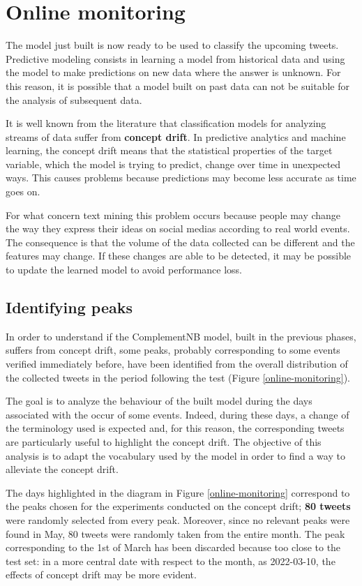 \section{Online monitoring}

The model just built is now ready to be used to classify the upcoming tweets. Predictive modeling consists in learning a model from historical data and using the model to make predictions on new data where the answer is unknown. For this reason, it is possible that a model built on past data can not be suitable for the analysis of subsequent data.

It is well known from the literature that classification models for analyzing streams of data suffer from \textbf{concept drift}. In predictive analytics and machine learning, the concept drift means that the statistical properties of the target variable, which the model is trying to predict, change over time in unexpected ways. This causes problems because predictions may become less accurate as time goes on.

For what concern text mining this problem occurs because people may change the way they express their ideas on social medias according to real world events. The consequence is that the volume of the data collected can be different and the features may change. 
If these changes are able to be detected, it may be possible to update the learned model to avoid performance loss. 

\subsection{Identifying peaks}

In order to understand if the ComplementNB model, built in the previous phases, suffers from concept drift, some {peaks},  probably corresponding to some events verified immediately before, have been identified from the overall distribution of the collected tweets  in the period following the test (Figure \ref{online-monitoring}). 

The goal is to analyze the behaviour of the built model during the days associated with the occur of some  events. Indeed, during these days, a change of the terminology used is expected and, for this reason, the corresponding tweets are particularly useful to highlight the concept drift. 
The objective of this analysis is to adapt the vocabulary used by the model in order to find a way to alleviate the concept drift.

The days highlighted in the diagram in Figure \ref{online-monitoring} correspond to the peaks chosen for the experiments conducted on the concept drift; \textbf{80 tweets} were randomly selected from every peak. Moreover, since no relevant peaks were found in May, 80 tweets were randomly taken from the entire month.
The peak corresponding to the 1st of March has been discarded because too close to the test set: in a more central date with respect to the month, as 2022-03-10, the effects of concept drift may be more evident.

